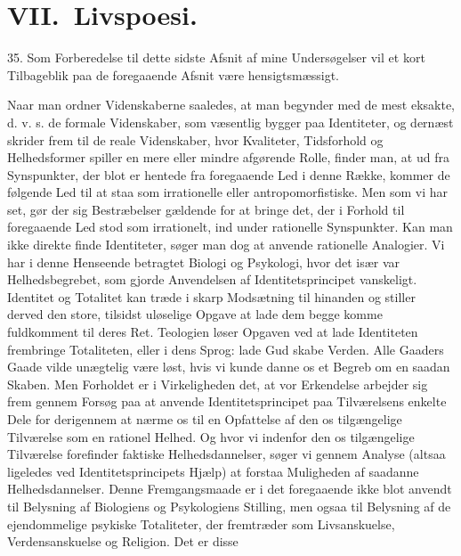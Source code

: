 \documentclass[12pt]{article}
\newcommand{\apage}[1]{\marginnote{\footnotesize\textit{[#1]}}}
\begin{document}
\section*{VII.\ Livspoesi.}

\setcounter{footnote}{0}%
\apage{116}35. Som Forberedelse til dette sidste Afsnit af mine Undersøgelser
vil et kort Tilbageblik paa de foregaaende Afsnit være hensigtsmæssigt.

Naar man ordner Videnskaberne saaledes, at man begynder med de mest eksakte, d.
v. s. de formale Videnskaber, som væsentlig bygger paa Identiteter, og dernæst
skrider frem til de reale Videnskaber, hvor Kvaliteter, Tidsforhold og
Helhedsformer spiller en mere eller mindre afgørende Rolle, finder man, at ud
fra Synspunkter, der blot er hentede fra foregaaende Led i denne Række, kommer
de følgende Led til at staa som irrationelle eller
\guillemotright{}antropomorfistiske\guillemotleft{}. Men som vi har set, gør
der sig Bestræbelser gældende for at bringe det, der i Forhold til foregaaende
Led stod som irrationelt, ind under \guillemotright{}rationelle\guillemotleft{}
Synspunkter. Kan man ikke direkte finde Identiteter, søger man dog at anvende
rationelle Analogier. Vi har i denne Henseende betragtet Biologi og Psykologi,
hvor det især var Helhedsbegrebet, som gjorde Anvendelsen af
Identitetsprincipet vanskeligt. Identitet og Totalitet kan træde i skarp
Modsætning til hinanden og stiller derved den store, tilsidst uløselige Opgave
at lade dem begge komme fuldkomment til deres Ret. Teologien løser Opgaven ved
at lade Identiteten frembringe Totaliteten, eller i dens Sprog: lade Gud skabe
Verden. Alle Gaaders Gaade vilde unægtelig være løst, hvis vi kunde danne os et
Begreb
\setcounter{footnote}{0}%
\apage{117}om en saadan Skaben. Men Forholdet er i Virkeligheden det, at vor
Erkendelse arbejder sig frem gennem Forsøg paa at anvende Identitetsprincipet
paa Tilværelsens enkelte Dele for derigennem at nærme os til en Opfattelse af
den os tilgængelige Tilværelse som en rationel Helhed. Og hvor vi indenfor den
os tilgængelige Tilværelse forefinder faktiske Helhedsdannelser, søger vi
gennem Analyse (altsaa ligeledes ved Identitetsprincipets Hjælp) at forstaa
Muligheden af saadanne Helhedsdannelser. Denne Fremgangsmaade er i det
foregaaende ikke blot anvendt til Belysning af Biologiens og Psykologiens
Stilling, men ogsaa til Belysning af de ejendommelige psykiske Totaliteter, der
fremtræder som Livsanskuelse, Verdensanskuelse og Religion. Det er disse
\end{document}
